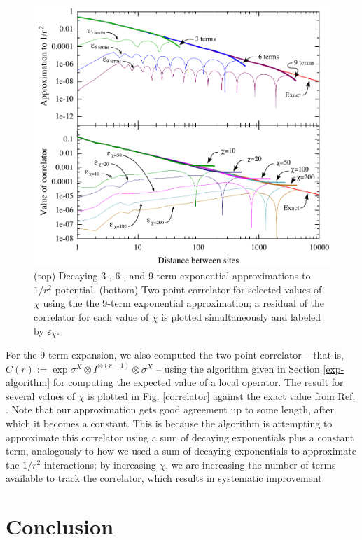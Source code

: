 \documentclass[12pt]{amsbook}
\theoremstyle{plain}
\theoremstyle{definition}
\theoremstyle{remark}
\begin{document}
\begin{figure}
\includegraphics[width=\columnwidth]{images/combined}
\caption{(top) Decaying 3-, 6-, and 9-term exponential approximations to $1/r^2$ potential.  (bottom) Two-point correlator for selected values of $\chi$ using the the 9-term exponential approximation;  a residual of the correlator for each value of $\chi$ is plotted simultaneously and labeled by $\varepsilon_\chi$.}
\label{correlator}
\label{expansion}
\end{figure}

For the 9-term expansion, we also computed the two-point correlator -- that is, $C(r):=\exp{\sigma^X \otimes I^{\otimes (r-1)}\otimes\sigma^X}$ -- using the algorithm given in Section \ref{exp-algorithm} for computing the expected value of a local operator.  The result for several values of $\chi$ is plotted in Fig. \ref{correlator} against the exact value from Ref. \cite{PhysRevLett.60.639}.  Note that our approximation gets good agreement up to some length, after which it becomes a constant.  This is because the algorithm is attempting to approximate this correlator using a sum of decaying exponentials plus a constant term, analogously to how we used a sum of decaying exponentials to approximate the $1/r^2$ interactions;  by increasing $\chi$, we are increasing the number of terms available to track the correlator, which results in systematic improvement.
\section{Conclusion}
\end{document}
